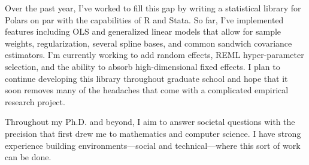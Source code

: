 \documentclass{grad-statement}
\begin{document}
Over the past year, I've worked to fill this gap by writing a statistical library for Polars on par with the capabilities of R and Stata.
So far, I've implemented features including OLS and generalized linear models that allow for sample weights, regularization, several spline bases, and common sandwich covariance estimators.
I'm currently working to add random effects, REML hyper-parameter selection, and the ability to absorb high-dimensional fixed effects.
I plan to continue developing this library throughout graduate school and hope that it soon removes many of the headaches that come with a complicated empirical research project.

\bigskip

Throughout my Ph.D. and beyond, I aim to answer societal questions with the precision that first drew me to mathematics and computer science.
I have strong experience building environments---social and technical---where this sort of work can be done.
\end{document}
